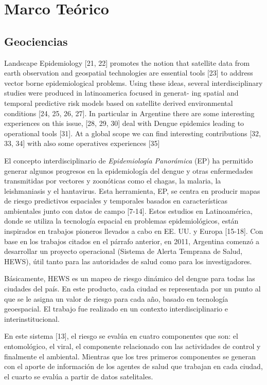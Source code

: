 \chapter{Marco Teórico}

\section{Geociencias}
Landscape Epidemiology [21, 22] promotes the notion that satellite data
from earth observation and geospatial technologies are essential tools [23] to
address vector borne epidemiological problems. Using these ideas, several
interdisciplinary studies were produced in latinoamerica focused in generat-
ing spatial and temporal predictive risk models based on satellite derived
environmental conditions [24, 25, 26, 27]. In particular in Argentine there
are some interesting experiences on this issue, [28, 29, 30] deal with Dengue
epidemics leading to operational tools [31]. At a global scope we can find
interesting contributions [32, 33, 34] with also some operatives experiences
[35]


El concepto interdisciplinario de \textit{Epidemiología Panorámica} (EP)
ha permitido generar algunos progresos en la epidemiología del dengue y otras
enfermedades transmitidas por vectores y zoonóticas como el chagas, la
malaria, la leishmaniasis y el hantavirus. Esta herramienta, EP, se centra en
producir mapas de riesgo predictivos espaciales y temporales basados en
características ambientales junto con datos de campo [7-14].
Estos estudios en Latinoamérica, donde se utiliza la tecnología espacial en
problemas epidemiológicos, están inspirados en trabajos pioneros llevados a cabo
en EE. UU. y Europa [15-18].
Con base en los trabajos citados en el párrafo anterior, en 2011, Argentina
comenzó a desarrollar un proyecto operacional
(Sistema de Alerta Temprana de Salud, HEWS), útil tanto para las autoridades de
salud como para los investigadores.

Básicamente, HEWS es un mapeo de riesgo
dinámico del dengue para todas las ciudades del país. En este producto, cada
ciudad es representada por un punto al que se le asigna un valor de riesgo para
cada año, basado en tecnología geoespacial. El trabajo fue realizado en un
contexto interdisciplinario e interinstitucional.

En este sistema [13], el riesgo se evalúa en cuatro componentes que son: el
entomológico, el viral, el componente relacionado con las actividades de
control y finalmente el ambiental. Mientras que los tres primeros componentes
se generan con el aporte de información de los agentes de salud que trabajan en cada
ciudad, el cuarto se evalúa a partir de datos satelitales.

